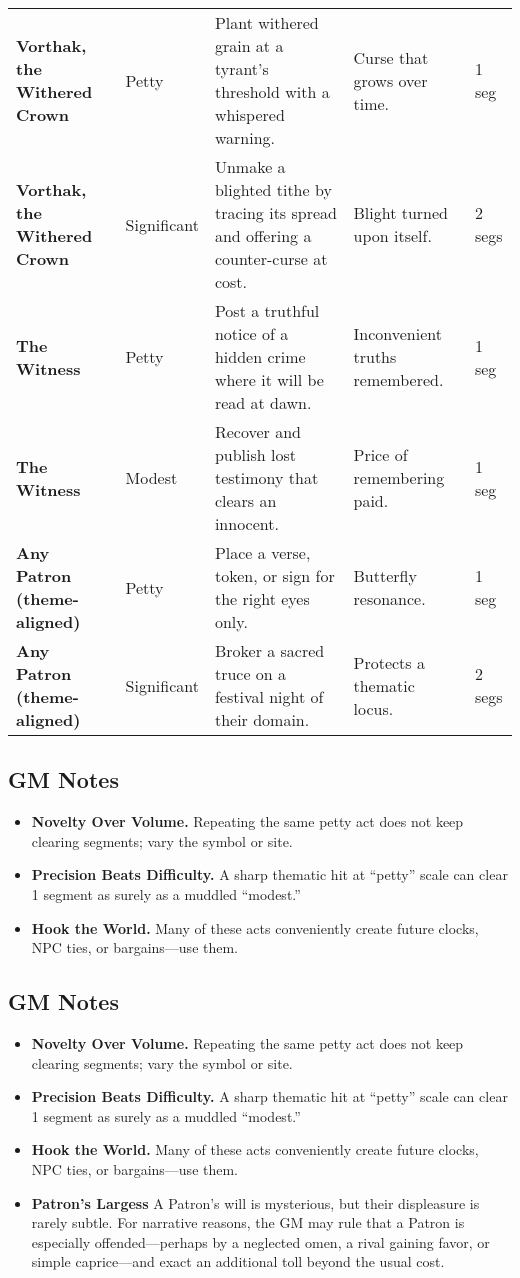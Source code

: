 \begin{table}[h]
\begin{tabularx}{\linewidth}{>{\bfseries}l l X X l}
Vorthak, the Withered Crown & Petty & Plant withered grain at a tyrant's threshold with a whispered warning. & Curse that grows over time. & 1 seg \\
Vorthak, the Withered Crown & Significant & Unmake a blighted tithe by tracing its spread and offering a counter-curse at cost. & Blight turned upon itself. & 2 segs \\
The Witness & Petty & Post a truthful notice of a hidden crime where it will be read at dawn. & Inconvenient truths remembered. & 1 seg \\
The Witness & Modest & Recover and publish lost testimony that clears an innocent. & Price of remembering paid. & 1 seg \\
Any Patron (theme-aligned) & Petty & Place a verse, token, or sign for the right eyes only. & Butterfly resonance. & 1 seg \\
Any Patron (theme-aligned) & Significant & Broker a sacred truce on a festival night of their domain. & Protects a thematic locus. & 2 segs \\
\bottomrule
\end{tabularx}
\end{table}

\subsection*{GM Notes}\label{subsec:acts-service-gm}
\begin{itemize}
\item \textbf{Novelty Over Volume.} Repeating the same petty act does not keep clearing segments; vary the symbol or site.
\item \textbf{Precision Beats Difficulty.} A sharp thematic hit at ``petty'' scale can clear 1 segment as surely as a muddled ``modest.''
\item \textbf{Hook the World.} Many of these acts conveniently create future clocks, NPC ties, or bargains---use them.
\end{itemize}

\subsection*{GM Notes}\label{subsec:acts-service-gm}
\begin{itemize}
\item \textbf{Novelty Over Volume.} Repeating the same petty act does not keep clearing segments; vary the symbol or site.
\item \textbf{Precision Beats Difficulty.} A sharp thematic hit at “petty” scale can clear 1 segment as surely as a muddled “modest.”
\item \textbf{Hook the World.} Many of these acts conveniently create future clocks, NPC ties, or bargains—use them.
\item \textbf{Patron’s Largess} A Patron’s will is mysterious, but their displeasure is rarely subtle. For narrative reasons, the GM may rule that a Patron is especially offended—perhaps by a neglected omen, a rival gaining favor, or simple caprice—and exact an additional toll beyond the usual cost.
\end{itemize}
